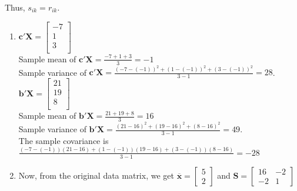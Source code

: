 \documentclass[12pt]{article}
\newenvironment{problem}[2][Problem]{\begin{trivlist}
\item[\hskip \labelsep {\bfseries #1}\hskip \labelsep {\bfseries #2.}]}{\end{trivlist}}
\newcommand{\vct}{\mathbf}
\begin{document}
Thus, $s_{ik} = r_{ik}$.

\begin{problem}{3.14}
\end{problem}

\begin{enumerate}[label=\alph*)]
	\item $\vct{c'X} = \begin{bmatrix}
           -7 \\
           1 \\
           3 \\
         \end{bmatrix}$\\
         
         Sample mean of $\vct{c'X} = \frac{-7 + 1 + 3}{3} = -1$\\
         
         Sample variance of $\vct{c'X} = \frac{(-7 - (-1))^2 + (1 - (-1))^2 + (3 - (-1))^2}{3-1} = 28$.\\
         
         $\vct{b'X} = \begin{bmatrix}
           21 \\
           19 \\
           8 \\
         \end{bmatrix}$\\
         
         Sample mean of $\vct{b'X} = \frac{21 + 19 + 8}{3} = 16$\\
         
         Sample variance of $\vct{b'X} = \frac{(21 - 16)^2 + (19 - 16)^2 + (8 - 16)^2}{3-1} = 49$.\\
         
         The sample covariance is $\frac{(-7 - (-1))(21 - 16) + (1 - (-1))(19 - 16)+ (3 - (-1))(8 - 16)}{3-1} = -28$
         
	\item Now, from the original data matrix, we get $\overline{\vct{x}} = \begin{bmatrix}
           5 \\
           2
         \end{bmatrix}$ and $\vct{S} = \begin{bmatrix}
           16 & -2\\
           -2 & 1
         \end{bmatrix}$\\
         

\end{enumerate}
\end{document}
